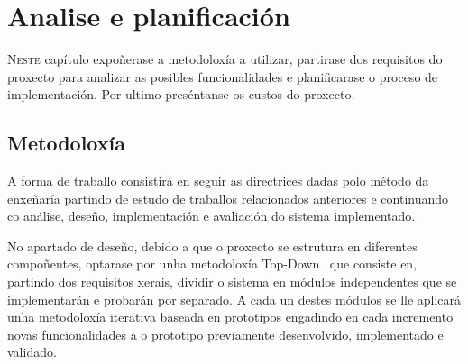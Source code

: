 \chapter{Analise e planificación}
\label{chap:Analise e planificación}
\lettrine{N}{este} capítulo expoñerase a metodoloxía a utilizar, partirase dos requisitos do proxecto para analizar as posibles funcionalidades e planificarase o proceso de implementación. Por ultimo preséntanse os custos do proxecto.

\section{Metodoloxía}
A forma de traballo consistirá en seguir as directrices dadas polo método da enxeñaría partindo de estudo de traballos relacionados anteriores e continuando co análise, deseño, implementación e avaliación do sistema implementado.

No apartado de deseño, debido a que o proxecto se estrutura en diferentes compoñentes, optarase por unha metodoloxía Top-Down~\cite{TopdownBottomupDesign2019} que consiste en, partindo dos requisitos xerais, dividir o sistema en módulos independentes que se implementarán e probarán por separado. A cada un destes módulos se lle aplicará unha metodoloxía iterativa baseada en prototipos engadindo en cada incremento novas funcionalidades a o prototipo previamente desenvolvido, implementado e validado.

